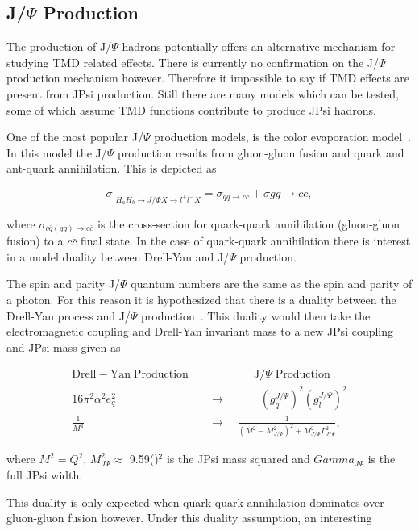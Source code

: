 \subsection{J/$\Psi$ Production}
The production of J/$\Psi$ hadrons potentially offers an alternative mechanism
for studying TMD related effects.  There is currently no confirmation on the
J/$\Psi$ production mechanism however.  Therefore it impossible to say if TMD
effects are present from JPsi production.  Still there are many models which can
be tested, some of which assume TMD functions contribute to produce JPsi
hadrons.

One of the most popular J/$\Psi$ production models, is the color evaporation
model~\cite{VOGT1999197}.  In this model the J/$\Psi$ production results from
gluon-gluon fusion and quark and ant-quark annihilation.  This is depicted as

\begin{equation}
  \sigma \Big |_{H_aH_b\rightarrow J/\Phi X \rightarrow l^+l^- X}
  = \sigma_{q\bar{q}\rightarrow c\bar{c}} + \sigma{gg\rightarrow c\bar{c}},
\end{equation}

\noindent
where $\sigma_{q\bar{q}(gg)\rightarrow c\bar{c}}$ is the cross-section for
quark-quark annihilation (gluon-gluon fusion) to a $c\bar{c}$ final state.  In
the case of quark-quark annihilation there is interest in a model duality
between Drell-Yan and J/$\Psi$ production.

The spin and parity J/$\Psi$ quantum numbers are the same as the spin and parity
of a photon.  For this reason it is hypothesized that there is a duality between
the Drell-Yan process and J/$\Psi$
production~\cite{Anselmino:2004ki,Barone2007,Sissakian:2008th}.  This duality
would then take the electromagnetic coupling and Drell-Yan invariant mass to a
new JPsi coupling and JPsi mass given as

\begin{align}
  \nonumber
  \mathrm{Drell-}\mathrm{Yan}\; \mathrm{Production} \quad &
  \quad\quad\quad\quad \mathrm{J/}\Psi \;\mathrm{Production}
  \\
  16\pi^2\alpha^2e_q^2 \quad &\rightarrow
  \quad \quad\quad (g_q^{J/\Psi})^2(g_l^{J/\Psi})^2
  \\
  \frac{1}{M^4} \quad \quad &\rightarrow \quad
  \frac{1}{(M^2-M^2_{J/\Psi})^2 + M^2_{J/\Psi}\Gamma^2_{J/\Psi}},
\end{align}

\noindent
where $M^2 = Q^2$, $M_{J\Psi}^2 \approx$ 9.59({\gvcw})$^2$ is the JPsi mass
squared and $Gamma_{J\Psi}$ is the full JPsi width.

This duality is only expected when quark-quark annihilation dominates over
gluon-gluon fusion however.  Under this duality assumption, an interesting 
